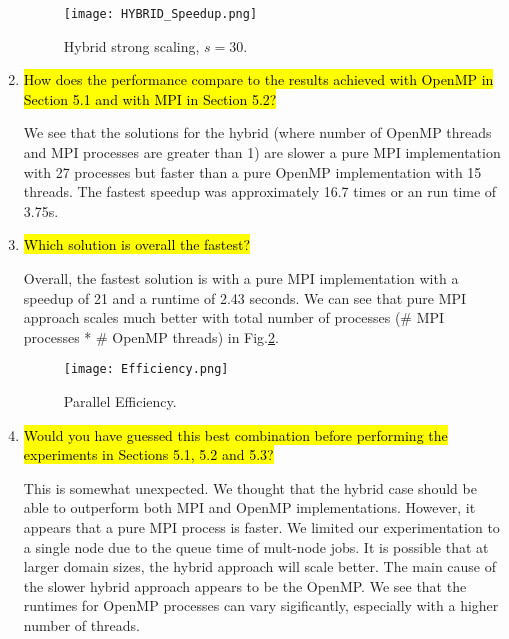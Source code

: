 \documentclass{article}
\begin{document}
\begin{enumerate}
\begin{description}
	\end{description}
		
	\begin{figure}[p] %
	 	\begin{center}
	 		\texttt{[image: HYBRID\_Speedup.png]} %
	 		\caption{Hybrid strong scaling, $s=30$.}
	 		\label{fig:hybrid_speedup}
	 	\end{center}
	\end{figure}
	
	\item \hl{How does the performance compare to the results achieved with OpenMP in Section 5.1 and with MPI in Section 5.2?}

	We see that the solutions for the hybrid (where number of OpenMP threads and MPI processes are greater than 1) are slower a pure MPI implementation with 27 processes but faster than a pure OpenMP implementation with 15 threads. The fastest speedup was approximately 16.7 times or an run time of 3.75s. 
	
	\item \hl{Which solution is overall the fastest?}

	Overall, the fastest solution is with a pure MPI implementation with a speedup of 21 and a runtime of 2.43 seconds. We can see that pure MPI approach scales much better with total number of processes (\# MPI processes * \# OpenMP threads) in Fig.\ref{fig:efficiency}.
	
		\begin{figure}[p] %
	 	\begin{center}
	 		\texttt{[image: Efficiency.png]} %
	 		\caption{Parallel Efficiency.}
	 		\label{fig:efficiency}
	 	\end{center}
	\end{figure}
	
	\item \hl{Would you have guessed this best combination before performing the experiments in Sections 5.1, 5.2 and 5.3?}

	This is somewhat unexpected. We thought that the hybrid case should be able to outperform both MPI and OpenMP implementations. However, it appears that a pure MPI process is faster. We limited our experimentation to a single node due to the queue time of mult-node jobs. It is possible that at larger domain sizes, the hybrid approach will scale better. The main cause of the slower hybrid approach appears to be the OpenMP. We see that the runtimes for OpenMP processes can vary sigificantly, especially with a higher number of threads. 
\end{enumerate}
\end{document}
